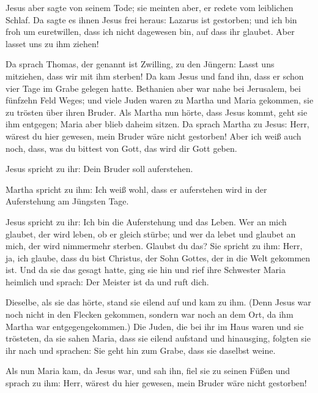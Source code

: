  Jesus aber sagte von seinem Tode; sie meinten aber, er
redete vom leiblichen Schlaf.  Da sagte es ihnen Jesus
frei heraus: Lazarus ist gestorben;  und ich bin froh um
euretwillen, dass ich nicht dagewesen bin, auf dass ihr glaubet. Aber
lasset uns zu ihm ziehen!

 Da sprach Thomas, der genannt ist Zwilling, zu den
Jüngern: Lasst uns mitziehen, dass wir mit ihm sterben! 
Da kam Jesus und fand ihn, dass er schon vier Tage im Grabe gelegen
hatte.  Bethanien aber war nahe bei Jerusalem, bei
fünfzehn Feld Weges;  und viele Juden waren zu Martha und
Maria gekommen, sie zu trösten über ihren Bruder.  Als
Martha nun hörte, dass Jesus kommt, geht sie ihm entgegen; Maria aber
blieb daheim sitzen.  Da sprach Martha zu Jesus: Herr,
wärest du hier gewesen, mein Bruder wäre nicht gestorben!
 Aber ich weiß auch noch, dass, was du bittest von Gott,
das wird dir Gott geben.

 Jesus spricht zu ihr: Dein Bruder soll auferstehen.

 Martha spricht zu ihm: Ich weiß wohl, dass er
auferstehen wird in der Auferstehung am Jüngsten Tage.

 Jesus spricht zu ihr: Ich bin die Auferstehung und das
Leben. Wer an mich glaubet, der wird leben, ob er gleich stürbe;
 und wer da lebet und glaubet an mich, der wird
nimmermehr sterben. Glaubst du das?  Sie spricht zu ihm:
Herr, ja, ich glaube, dass du bist Christus, der Sohn Gottes, der in die
Welt gekommen ist.  Und da sie das gesagt hatte, ging sie
hin und rief ihre Schwester Maria heimlich und sprach: Der Meister ist
da und ruft dich.

 Dieselbe, als sie das hörte, stand sie eilend auf und
kam zu ihm.  (Denn Jesus war noch nicht in den Flecken
gekommen, sondern war noch an dem Ort, da ihm Martha war
entgegengekommen.)  Die Juden, die bei ihr im Haus waren
und sie trösteten, da sie sahen Maria, dass sie eilend aufstand und
hinausging, folgten sie ihr nach und sprachen: Sie geht hin zum Grabe,
dass sie daselbst weine.

 Als nun Maria kam, da Jesus war, und sah ihn, fiel sie
zu seinen Füßen und sprach zu ihm: Herr, wärest du hier gewesen, mein
Bruder wäre nicht gestorben!

